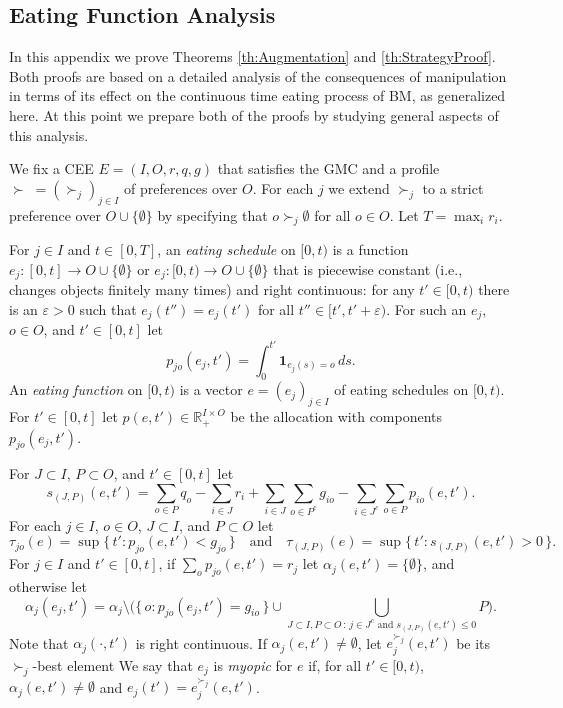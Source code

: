 \documentclass[12pt, A4paper]{article}
\theoremstyle{definition}
\renewcommand{\Re}{\mathbb{R}}
\newcommand{\varep}{\varepsilon}
\newcommand{\bone}{\mathbf{1}}
\begin{document}
\begin{appendix}
\section{Eating Function Analysis} \label{app:Eating}

In this appendix we prove Theorems \ref{th:Augmentation} and \ref{th:StrategyProof}.  Both proofs are based on a detailed analysis of the consequences of manipulation in terms of its effect on the continuous time eating process of BM, as generalized here.  At this point we prepare both of the proofs by studying general aspects of this analysis.  

We fix a  CEE $E = (I,O,r,q,g)$ that satisfies the GMC and a profile $\succ \; = (\succ_j)_{j \in I}$ of preferences over $O$. 
For each $j$ we extend $\succ_j$ to a strict preference over $O \cup \{\emptyset\}$ by specifying that $o \succ_j \emptyset$ for all $o \in O$.  
Let $T = \max_i r_i$.

For $j \in I$ and $t \in [0,T]$, an \emph{eating schedule} on $[0,t)$ is a function $e_j \colon [0,t] \to O \cup \{\emptyset\}$ or  $e_j \colon [0,t) \to O \cup \{\emptyset\}$
that is  piecewise constant (i.e., changes objects finitely many times)  and right continuous: for any $t' \in [0,t)$ there is an $\varep > 0$ such that $e_j(t'') = e_j(t')$ for all $t'' \in [t', t'+\varep)$.  
For such an $e_j$, $o \in O$, and $t' \in [0,t]$ let
$$p_{jo}(e_j,t') = \int_0^{t'} \bone_{e_j(s) = o} \, ds.$$
An \emph{eating function} on $[0,t)$ is a vector $e = (e_j)_{j \in I}$ of eating schedules on $[0,t)$.
For $t' \in [0,t]$ let $p(e,t') \in \Re_+^{I \times O}$ be the allocation with components $p_{jo}(e_j,t')$. 

For $J \subset I$, $P \subset O$, and $t' \in [0,t]$ let 
$$s_{(J,P)}(e,t') = \sum_{o \in P} q_o - \sum_{i \in J} r_i + \sum_{i \in J} \sum_{o \in P^c} g_{io} - \sum_{i \in J^c} \sum_{o \in P} p_{io}(e,t').$$  For each $j \in I$, $o \in O$, $J \subset I$, and $P \subset O$ let $$\tau_{jo}(e) = \sup \{\, t' : p_{jo}(e,t') < g_{jo} \,\} \quad \text{and} \quad \tau_{(J,P)}(e) = \sup \{\, t' : s_{(J,P)}(e,t') > 0 \,\}.$$
For $j \in I$ and $t' \in [0,t]$, if $\sum_o p_{jo}(e,t') = r_j$ let $\alpha_j(e,t') = \{\emptyset\}$, and otherwise let
$$\alpha_j(e_j,t') = \alpha_j  \setminus \Big(\{\, o : p_{jo}(e_j,t') = g_{io} \,\} \cup \bigcup_{J \subset I, P \subset O \, : \, \text{$j \in J^c$ and $s_{(J,P)}(e,t') \le 0$}} P \Big).$$   Note that $\alpha_j(\cdot,t')$ is right continuous.
If $\alpha_j(e,t') \ne \emptyset$, let $e^{\succ_j}_j(e,t')$ be its $\succ_j$-best element  We say that $e_j$ is \emph{myopic} for $e$ if,  for all $t' \in [0,t)$, $\alpha_j(e,t') \ne \emptyset$ and
$e_j(t') = e^{\succ_j}_j(e,t')$.


\end{appendix}
\end{document}
